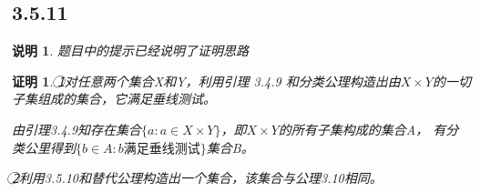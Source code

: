 \documentclass{article}
\theoremstyle{mystyle}
\newtheorem*{zremark}{说明}
\theoremstyle{zproofstyle}
\newtheorem*{zproof}{证明}
\begin{document}
\subsection*{3.5.11}
\begin{zgraytheorem}
  \begin{zremark}
    题目中的提示已经说明了证明思路
  \end{zremark}
\end{zgraytheorem}

\begin{zproof}
  \textcircled{1}对任意两个集合X和Y，利用引理 3.4.9 和分类公理构造出由$X \times Y$的一切子集组成的集合，它满足垂线测试。

  由引理3.4.9知存在集合$\{a : a \in X \times Y\}$，即$X\times Y$的所有子集构成的集合A，
  有分类公里得到$\{b \in A : b\text{满足垂线测试} \}$集合B。

  \textcircled{2}利用3.5.10和替代公理构造出一个集合，该集合与公理3.10相同。


\end{zproof}
\end{document}

